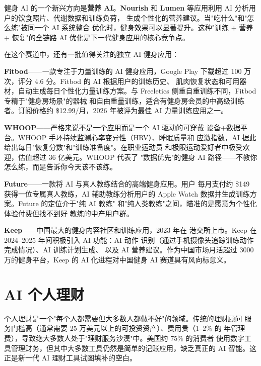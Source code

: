 健身 AI 的一个新兴方向是\textbf{营养 AI}。\textbf{Nourish} 和
\textbf{Lumen} 等应用利用 AI 分析用户的饮食照片、代谢数据和训练负荷，
生成个性化的营养建议。当"吃什么"和"怎么练"被同一个 AI 系统整合
优化时，健身效果可以显著提升。这种"训练 + 营养 + 恢复"的全链路 AI
优化是下一代健身应用的核心竞争点。

在这个赛道中，还有一批值得关注的独立 AI 健身应用：

\textbf{Fitbod}——一款专注于力量训练的 AI 健身应用，Google Play
下载超过 100 万次，评分 4.6 分。Fitbod 的 AI 根据用户的训练历史、
肌肉恢复状态和可用器材，自动生成每日个性化力量训练方案。与
Freeletics 侧重自重训练不同，Fitbod 专精于"健身房场景"的器械
和自由重量训练，适合有健身房会员的中高级训练者。订阅价格约
\$12.99/月，2026 年被评为最佳 AI 力量训练应用之一。

\textbf{WHOOP}——严格来说不是一个应用而是一个 AI 驱动的可穿戴
设备+数据平台。WHOOP 手环持续监测心率变异性（HRV）、睡眠质量和
应激指数，AI 据此给出每日"恢复分数"和"训练准备度"。在职业运动员
和极限运动爱好者中极受欢迎，估值超过 36 亿美元。WHOOP 代表了
"数据优先"的健身 AI 路径——不教你怎么练，而是告诉你今天该不该练。

\textbf{Future}——一款将 AI 与真人教练结合的高端健身应用。用户
每月支付约 \$149 获得一位专属真人教练，AI 辅助教练分析用户的
Apple Watch 数据并生成训练方案。Future 的定位介于"纯 AI 教练"
和"纯人类教练"之间，瞄准的是愿意为个性化体验付费但找不到好
教练的中产用户群。

\textbf{Keep}——中国最大的健身内容社区和训练应用，2023 年在
港交所上市。Keep 在 2024--2025 年间积极引入 AI 功能：AI 动作
识别（通过手机摄像头追踪训练动作完成情况）、AI 训练计划生成、
以及 AI 营养建议。作为中国市场月活超过 3000 万的健身平台，Keep
的 AI 化进程对中国健身 AI 赛道具有风向标意义。



\section{AI 个人理财}
\label{sec:life-finance}

个人理财是一个"每个人都需要但大多数人都做不好"的领域。传统的理财顾问
服务门槛高（通常需要 25 万美元以上的可投资资产）、费用贵（1--2\% 的
年管理费），导致绝大多数人处于"理财服务沙漠"中。美国约 75\% 的消费者
使用数字工具管理财务，但其中大多数工具仍然是简单的记账应用，缺乏真正的
AI 智能。这正是新一代 AI 理财工具试图填补的空白。

